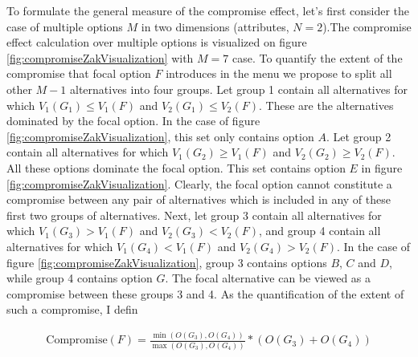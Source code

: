 \documentclass[a4paper,12pt]{article}
\begin{document}
To formulate the general measure of the compromise effect, let's first consider the case of multiple options $M$ in two dimensions (attributes, $N = 2$).The compromise effect  calculation over multiple options is visualized on figure \ref{fig:compromiseZakVisualization} with $M = 7$ case. To quantify the extent of the compromise that focal option $F$ introduces in the menu we propose to split all other $M - 1$ alternatives into four groups. Let group 1 contain all alternatives for which $V_1(G_1 ) \le V_1(F)$ and $V_2(G_1 ) \le V_2(F)$. These are the alternatives dominated by the focal option. In the case of figure \ref{fig:compromiseZakVisualization}, this set only contains option $A$. Let group 2 contain all alternatives for which $V_1(G_2 ) \ge V_1(F)$ and $V_2(G_2 ) \ge V_2(F)$. All these options dominate the focal option. This set contains option $E$ in figure \ref{fig:compromiseZakVisualization}. Clearly, the focal option cannot constitute a compromise between any pair of alternatives which is included in any of these first two groups of alternatives. Next, let group 3 contain all alternatives for which $V_1(G_3 ) > V_1(F)$ and $V_2(G_3 ) < V_2(F)$, and group 4 contain all alternatives for which $V_1(G_4 ) < V_1(F)$ and $V_2(G_4 ) > V_2(F)$. In the case of figure \ref{fig:compromiseZakVisualization}, group 3 contains options $B$, $C$ and $D$, while group 4 contains option $G$. The focal alternative can be viewed as a compromise between these groups 3 and 4. As the quantification of the extent of such a compromise, I defin

\begin{align}\label{}
    \text{Compromise}(F) = \frac{\min(O(G_3), O(G_4))}{\max(O(G_3), O(G_4))} * (O(G_3) + O(G_4))
\end{align}
\end{document}
